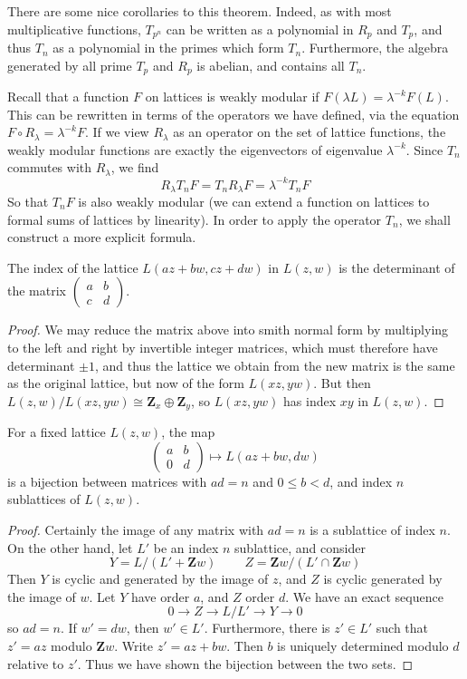 There are some nice corollaries to this theorem. Indeed, as with most multiplicative functions, $T_{p^n}$ can be written as a polynomial in $R_p$ and $T_p$, and thus $T_n$ as a polynomial in the primes which form $T_n$. Furthermore, the algebra generated by all prime $T_p$ and $R_p$ is abelian, and contains all $T_n$.

Recall that a function $F$ on lattices is weakly modular if $F(\lambda L) = \lambda^{-k} F(L)$. This can be rewritten in terms of the operators we have defined, via the equation $F \circ R_\lambda = \lambda^{-k} F$. If we view $R_\lambda$ as an operator on the set of lattice functions, the weakly modular functions are exactly the eigenvectors of eigenvalue $\lambda^{-k}$. Since $T_n$ commutes with $R_\lambda$, we find
%
\[ R_\lambda T_n F = T_n R_\lambda F = \lambda^{-k} T_n F \]
%
So that $T_n F$ is also weakly modular (we can extend a function on lattices to formal sums of lattices by linearity). In order to apply the operator $T_n$, we shall construct a more explicit formula.

\begin{lemma}
    The index of the lattice $L(az + bw, cz + dw)$ in $L(z,w)$ is the determinant of the matrix $\left( \begin{smallmatrix} a & b \\ c & d \end{smallmatrix} \right)$.
\end{lemma}
\begin{proof}
    We may reduce the matrix above into smith normal form by multiplying to the left and right by invertible integer matrices, which must therefore have determinant $\pm 1$, and thus the lattice we obtain from the new matrix is the same as the original lattice, but now of the form $L(xz, yw)$. But then $L(z,w)/L(xz,yw) \cong \mathbf{Z}_x \oplus \mathbf{Z}_y$, so $L(xz, yw)$ has index $xy$ in $L(z,w)$.
\end{proof}

\begin{lemma}
    For a fixed lattice $L(z,w)$, the map
    \[ \begin{pmatrix} a & b \\ 0 & d \end{pmatrix} \mapsto L(az + bw, dw) \]
    is a bijection between matrices with $ad = n$ and $0 \leq b < d$, and index $n$ sublattices of $L(z,w)$.
\end{lemma}
\begin{proof}
    Certainly the image of any matrix with $ad = n$ is a sublattice of index $n$. On the other hand, let $L'$ be an index $n$ sublattice, and consider
    \[ Y = L/(L' + \mathbf{Z}w)\ \ \ \ \ \ \ \ \ \ Z = \mathbf{Z}w/(L' \cap \mathbf{Z}w) \]
    Then $Y$ is cyclic and generated by the image of $z$, and $Z$ is cyclic generated by the image of $w$. Let $Y$ have order $a$, and $Z$ order $d$. We have an exact sequence
    \[ 0 \to Z \to L/L' \to Y \to 0 \]
    so $ad = n$. If $w' = dw$, then $w' \in L'$. Furthermore, there is $z' \in L'$ such that $z' = az$ modulo $\mathbf{Z}w$. Write $z' = az + bw$. Then $b$ is uniquely determined modulo $d$ relative to $z'$. Thus we have shown the bijection between the two sets.
\end{proof}

